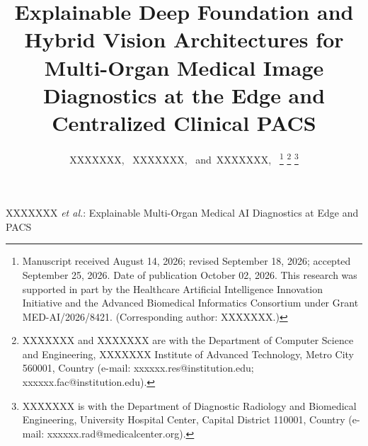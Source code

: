 \documentclass[journal]{IEEEtran}
\begin{document}
\title{Explainable Deep Foundation and Hybrid Vision Architectures for Multi-Organ Medical Image Diagnostics at the Edge and Centralized Clinical PACS}

\author{XXXXXXX,~
XXXXXXX,~
and~XXXXXXX,~%
\thanks{Manuscript received August 14, 2026; revised September 18, 2026; accepted September 25, 2026. Date of publication October 02, 2026. This research was supported in part by the Healthcare Artificial Intelligence Innovation Initiative and the Advanced Biomedical Informatics Consortium under Grant MED-AI/2026/8421. (Corresponding author: XXXXXXX.)}%
\thanks{XXXXXXX and XXXXXXX are with the Department of Computer Science and Engineering, XXXXXXX Institute of Advanced Technology, Metro City 560001, Country (e-mail: xxxxxx.res@institution.edu; xxxxxx.fac@institution.edu).}%
\thanks{XXXXXXX is with the Department of Diagnostic Radiology and Biomedical Engineering, University Hospital Center, Capital District 110001, Country (e-mail: xxxxxx.rad@medicalcenter.org).}}

%
{XXXXXXX \MakeLowercase{\textit{et al.}}: Explainable Multi-Organ Medical AI Diagnostics at Edge and PACS}

\maketitle
\end{document}
